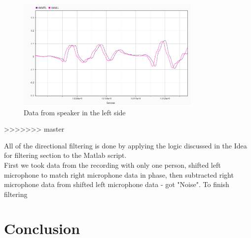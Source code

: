  \begin{figure}[htp]
	\centering
	\includegraphics[width=0.8\textwidth]{Illustrations/DataL.png}
	\caption{Data from speaker in the left side}
	\label{fig:L}
\end{figure}
>>>>>>> master

All of the directional filtering is done by applying the logic discussed in the Idea for filtering section to 
the Matlab script.\\
First we took data from the recording with only one person, shifted left microphone to match right microphone 
data in phase, then subtracted right microphone data from shifted left microphone data - got "Noise". To finish filtering 

\section{Conclusion}